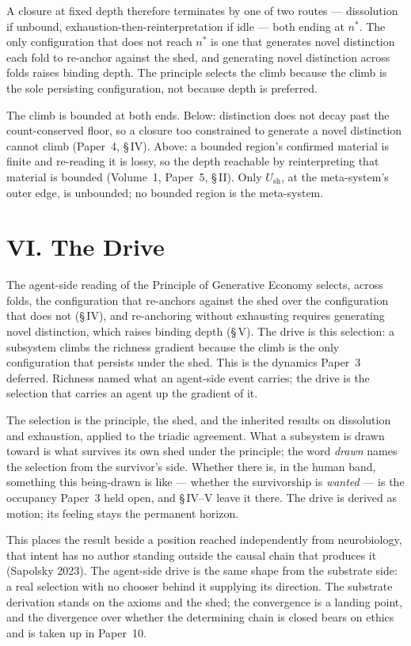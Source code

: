 \documentclass[11pt,oneside]{report}
\theoremstyle{definition}
\theoremstyle{remark}
\begin{document}
A closure at fixed depth therefore terminates by one of two routes --- dissolution if
unbound, exhaustion-then-reinterpretation if idle --- both ending at \ensuremath{n^{*}}.
The only configuration that does not reach \ensuremath{n^{*}} is one that generates
novel distinction each fold to re-anchor against the shed, and generating novel
distinction across folds raises binding depth. The principle selects the climb because
the climb is the sole persisting configuration, not because depth is preferred.

The climb is bounded at both ends. Below: distinction does not decay past the
count-conserved floor, so a closure too constrained to generate a novel distinction
cannot climb (Paper~4, \S\,IV). Above: a bounded region's confirmed material is finite
and re-reading it is lossy, so the depth reachable by reinterpreting that material is
bounded (Volume~1, Paper~5, \S\,II). Only \ensuremath{U_{\mathrm{sh}}}, at the
meta-system's outer edge, is unbounded; no bounded region is the meta-system.


\section*{VI. The Drive}

The agent-side reading of the Principle of Generative Economy selects, across folds,
the configuration that re-anchors against the shed over the configuration that does
not (\S\,IV), and re-anchoring without exhausting requires generating novel
distinction, which raises binding depth (\S\,V). The drive is this selection: a
subsystem climbs the richness gradient because the climb is the only configuration
that persists under the shed. This is the dynamics Paper~3 deferred. Richness named
what an agent-side event carries; the drive is the selection that carries an agent up
the gradient of it.

The selection is the principle, the shed, and the inherited results on dissolution and
exhaustion, applied to the triadic agreement. What a subsystem is drawn toward is what
survives its own shed under the principle; the word \emph{drawn} names the selection
from the survivor's side. Whether there is, in the human band, something this
being-drawn is like --- whether the survivorship is \emph{wanted} --- is the occupancy
Paper~3 held open, and \S\,IV--V leave it there. The drive is derived as motion; its
feeling stays the permanent horizon.

This places the result beside a position reached independently from neurobiology,
that intent has no author standing outside the causal chain that produces it
(Sapolsky 2023). The agent-side drive is the same shape from the substrate side: a
real selection with no chooser behind it supplying its direction. The substrate
derivation stands on the axioms and the shed; the convergence is a landing point, and
the divergence over whether the determining chain is closed bears on ethics and is
taken up in Paper~10.
\end{document}
